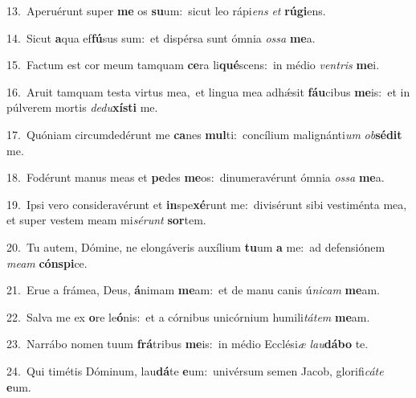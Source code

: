 {\numbfont\textcolor{\numbcolor}{13.}}~Aperuérunt super \textbf{me} os \textbf{su}\-um:~\star sicut leo rápi\textit{ens} \textit{et} \textbf{rú}\-\textbf{gi}ens.\par
{\numbfont\textcolor{\numbcolor}{14.}}~Sicut \textbf{a}\-qua ef\-\textbf{fú}\-sus sum:~\star et dispérsa sunt ómnia \textit{os}\-\textit{sa} \textbf{me}\-a.\par
{\numbfont\textcolor{\numbcolor}{15.}}~Factum est cor meum tamquam \textbf{ce}\-ra li\-\textbf{qué}\-scens:~\star in médio \textit{ven}\-\textit{tris} \textbf{me}\-i.\par
{\numbfont\textcolor{\numbcolor}{16.}}~Aruit tamquam testa virtus mea,~\dagger et lingua mea adhǽsit \textbf{fáu}\-cibus \textbf{me}\-is:~\star et in púlverem mortis \textit{de}\-\textit{du}\textbf{xís}\textbf{ti} me.\par
{\numbfont\textcolor{\numbcolor}{17.}}~Quóniam circumdedérunt me \textbf{ca}\-nes \textbf{mul}\-ti:~\star concílium malignánti\textit{um} \textit{ob}\-\textbf{sé}\textbf{dit} me.\par
{\numbfont\textcolor{\numbcolor}{18.}}~Fodérunt manus meas et \textbf{pe}\-des \textbf{me}\-os:~\star dinumeravérunt ómnia \textit{os}\-\textit{sa} \textbf{me}\-a.\par
{\numbfont\textcolor{\numbcolor}{19.}}~Ipsi vero consideravérunt et \textbf{in}\-spe\-\textbf{xé}\-runt me:~\star divisérunt sibi vestiménta mea, et super vestem meam mi\-\textit{sé}\-\textit{runt} \textbf{sor}\-tem.\par
{\numbfont\textcolor{\numbcolor}{20.}}~Tu autem, Dómine, ne elongáveris auxílium \textbf{tu}\-um \textbf{a} me:~\star ad defensiónem \textit{me}\-\textit{am} \textbf{cón}\-\textbf{spi}ce.\par
{\numbfont\textcolor{\numbcolor}{21.}}~Erue a frámea, Deus, \textbf{á}\-nimam \textbf{me}\-am:~\star et de manu canis ú\-\textit{ni}\-\textit{cam} \textbf{me}\-am.\par
{\numbfont\textcolor{\numbcolor}{22.}}~Salva me ex \textbf{o}\-re le\-\textbf{ó}\-nis:~\star et a córnibus unicórnium humili\-\textit{tá}\-\textit{tem} \textbf{me}\-am.\par
{\numbfont\textcolor{\numbcolor}{23.}}~Narrábo nomen tuum \textbf{frá}\-tribus \textbf{me}\-is:~\star in médio Ecclési\textit{æ} \textit{lau}\-\textbf{dá}\textbf{bo} te.\par
{\numbfont\textcolor{\numbcolor}{24.}}~Qui timétis Dóminum, lau\-\textbf{dá}\-te \textbf{e}\-um:~\star univérsum semen Jacob, glorifi\-\textit{cá}\-\textit{te} \textbf{e}\-um.\par
